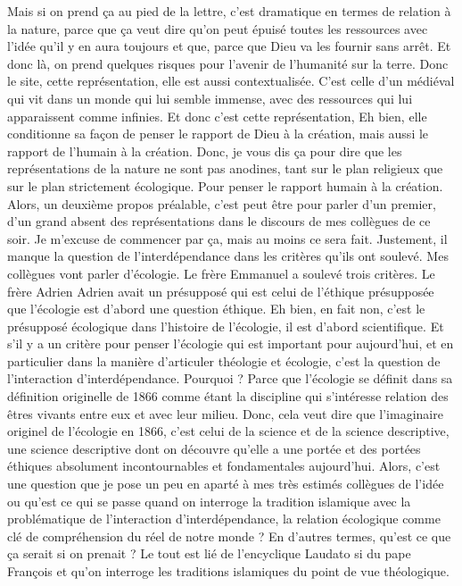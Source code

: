 Mais si on prend ça au pied de la lettre, c'est dramatique en termes de relation à la nature, parce que ça veut dire qu'on peut épuisé toutes les ressources avec l'idée qu'il y en aura toujours et que, parce que Dieu va les fournir sans arrêt. Et donc là, on prend quelques risques pour l'avenir de l'humanité sur la terre.
Donc le site, cette représentation, elle est aussi contextualisée. C'est celle d'un médiéval qui vit dans un monde qui lui semble immense, avec des ressources qui lui apparaissent comme infinies. Et donc c'est cette représentation, Eh bien, elle conditionne sa façon de penser le rapport de Dieu à la création, mais aussi le rapport de l'humain à la création. Donc, je vous dis ça pour dire que les représentations de la nature ne sont pas anodines, tant sur le plan religieux que sur le plan strictement écologique.
Pour penser le rapport humain à la création. Alors, un deuxième propos préalable, c'est peut être pour parler d'un premier, d'un grand absent des représentations dans le discours de mes collègues de ce soir. Je m'excuse de commencer par ça, mais au moins ce sera fait. Justement, il manque la question de l'interdépendance dans les critères qu'ils ont soulevé. Mes collègues vont parler d'écologie.
Le frère Emmanuel a soulevé trois critères. Le frère Adrien Adrien avait un présupposé qui est celui de l'éthique présupposée que l'écologie est d'abord une question éthique. Eh bien, en fait non, c'est le présupposé écologique dans l'histoire de l'écologie, il est d'abord scientifique. Et s'il y a un critère pour penser l'écologie qui est important pour aujourd'hui, et en particulier dans la manière d'articuler théologie et écologie, c'est la question de l'interaction d'interdépendance.
Pourquoi ? Parce que l'écologie se définit dans sa définition originelle de 1866 comme étant la discipline qui s'intéresse relation des êtres vivants entre eux et avec leur milieu. Donc, cela veut dire que l'imaginaire originel de l'écologie en 1866, c'est celui de la science et de la science descriptive, une science descriptive dont on découvre qu'elle a une portée et des portées éthiques absolument incontournables et fondamentales aujourd'hui.
Alors, c'est une question que je pose un peu en aparté à mes très estimés collègues de l'idée ou qu'est ce qui se passe quand on interroge la tradition islamique avec la problématique de l'interaction d'interdépendance, la relation écologique comme clé de compréhension du réel de notre monde ? En d'autres termes, qu'est ce que ça serait si on prenait ? Le tout est lié de l'encyclique Laudato si du pape François et qu'on interroge les traditions islamiques du point de vue théologique.

